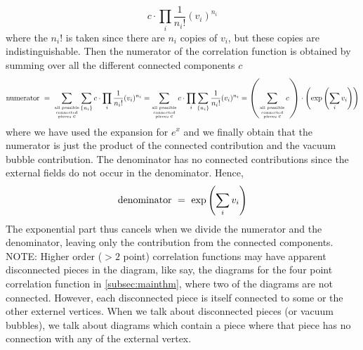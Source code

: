 $$c\cdot \prod\limits_{i} \frac{1}{n_i!} (v_i)^{n_i}$$
where the $n_i!$ is taken since there are $n_i$ copies of $v_i$, but these copies are indistinguishable. Then the numerator of the correlation function is obtained by summing over all the different connected components $c$
$$\mathrm{numerator} \ =\ \sum\limits_{\stackrel{\text{all possible}}{\stackrel{\text{connected}}{\text{\tiny pieces } c}}}\sum\limits_{\{n_i\}} c\cdot \prod\limits_{i} \frac{1}{n_i!} (v_i)^{n_i}  =\sum\limits_{\stackrel{\text{all possible}}{\stackrel{\text{connected}}{\text{\tiny pieces } c}}} c\cdot \prod\limits_{i} \sum\limits_{\{n_i\}} \frac{1}{n_i!} (v_i)^{n_i} = \qty(\sum\limits_{\stackrel{\text{all possible}}{\stackrel{\text{connected}}{\text{\tiny pieces } c}}} c)\cdot \qty(\exp\qty(\sum\limits_i v_i))$$
where we have used the expansion for $e^x$ and we finally obtain that the numerator is just the product of the connected contribution and the vacuum bubble contribution. The denominator has no connected contributions since the external fields do not occur in the denominator. Hence, 
$$\mathrm{denominator}\ = \ \exp\qty(\sum\limits_i v_i)$$
The exponential part thus cancels when we divide the numerator and the denominator, leaving only the contribution from the connected components. \\[0.2cm]
NOTE: Higher order ($>2 $ point) correlation functions may have apparent disconnected pieces in the diagram, like say, the diagrams for the four point correlation function in \ref{subsec:mainthm}, where two of the diagrams are not connected. However, each disconnected piece is itself connected to some or the other externel vertices. When we talk about disconnected pieces (or vacuum bubbles), we talk about diagrams which contain a piece where that piece has no connection with any of the external vertex.
